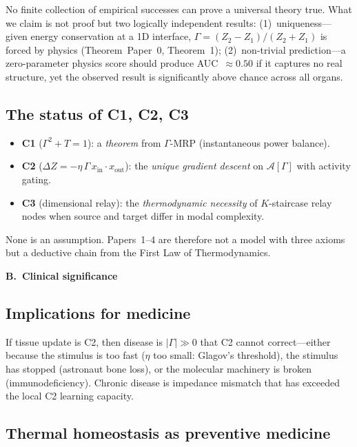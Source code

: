 \documentclass[aps,pre,twocolumn,superscriptaddress,floatfix]{revtex4-2}
\begin{document}
No finite collection of empirical successes can prove a
universal theory true.
What we claim is not proof but two logically independent
results: (1)~uniqueness---given energy conservation at a
1D interface, $\Gamma = (Z_2-Z_1)/(Z_2+Z_1)$ is forced
by physics (Theorem~Paper~0, Theorem~1); (2)~non-trivial
prediction---a zero-parameter physics score should produce
AUC~$\approx 0.50$ if it captures no real structure, yet
the observed result is significantly above chance across
all organs.

\subsection{The status of C1, C2, C3}

\begin{itemize}
  \item \textbf{C1} ($\Gamma^2 + T = 1$): a \emph{theorem}
    from $\Gamma$-MRP (instantaneous power balance).
  \item \textbf{C2} ($\Delta Z = -\eta\,\Gamma\,x_{\text{in}}
    \cdot x_{\text{out}}$): the \emph{unique gradient descent}
    on $\mathcal{A}[\Gamma]$ with activity gating.
  \item \textbf{C3} (dimensional relay):
    the \emph{thermodynamic necessity} of $K$-staircase
    relay nodes when source and target differ in
    modal complexity.
\end{itemize}
None is an assumption.  Papers~1--4 are therefore not a
model with three axioms but a deductive chain from the
First Law of Thermodynamics.

\medskip\noindent\textbf{\large B.~Clinical significance}
\medskip

\subsection{Implications for medicine}

If tissue update is C2, then disease is
$|\Gamma| \gg 0$ that C2 cannot correct---either because
the stimulus is too fast ($\eta$ too small: Glagov's
threshold), the stimulus has stopped (astronaut bone loss),
or the molecular machinery is broken (immunodeficiency).
Chronic disease is impedance mismatch that has exceeded
the local C2 learning capacity.

\subsection{Thermal homeostasis as preventive medicine}
\end{document}
